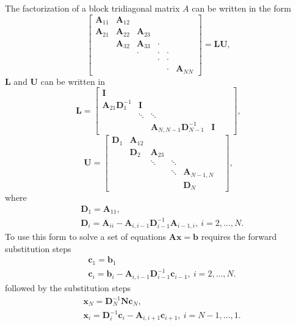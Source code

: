   \begin{alg}
    The factorization of a block tridiagonal matrix $A$ can be written
    in the form
    $$
    \left[
      \begin{array}{cccccc}
        \mathbf{A}_{11} & \mathbf{A}_{12}& & & & \\
        \mathbf{A}_{21} & \mathbf{A}_{22} & \mathbf{A}_{23} & & &\\
               & \mathbf{A}_{32} & \mathbf{A}_{33} & \cdot & &\\
               & & \cdot & \cdot & \cdot & \\
               & & & \cdot & \cdot & \\
        & & & & \cdot & \mathbf{A}_{NN}
      \end{array}
    \right]=\mathbf{LU},
    $$
    $\mathbf{L}$ and $\mathbf{U}$ can be written in 
    $$
 \mathbf{L}=\left[
      \begin{array}{cccccc}
       \mathbf{I} & & & & & \\
        \mathbf{A}_{21}\mathbf{D}_1^{-1} & \mathbf{I}& & & &\\
               & \ddots & \ddots & & \\
        & &\mathbf{A}_{N,N-1}\mathbf{D}_{N-1}^{-1} & \mathbf{I}
      \end{array}
    \right],
    $$
    $$
    \mathbf{U}=\left[
      \begin{array}{cccccc}
        \mathbf{D}_1 & \mathbf{A}_{12}& & & & \\
         & \mathbf{D}_2& \mathbf{A}_{23}& & &\\
               & & \ddots & \ddots & & \\
               & & & \ddots & \mathbf{A}_{N-1,N} & \\
        & & & & \mathbf{D}_N
      \end{array}
    \right],
    $$
    where
  \begin{align}
    &\mathbf{D}_1=\mathbf{A}_{11},\\
    &\mathbf{D}_i= \mathbf{A}_{ii}-\mathbf{A}_{i,i-1}\mathbf{D}_{i-1}^{-1}\mathbf{A}_{i-1,i},\ i=2,\ldots,N.
  \end{align}
  To use this form to solve a set of equations $\mathbf{Ax=b}$ requires the
  forward substitution steps
  \begin{align}
    &\mathbf{c}_1=\mathbf{b}_1\\
    &\mathbf{c}_i=\mathbf{b}_i-\mathbf{A}_{i,i-1}\mathbf{D}^{-1}_{i-1}\mathbf{c}_{i-1},\ i=2,\ldots,N.
  \end{align}
  followed by the substitution steps
  \begin{align}
   &\mathbf{x}_N=\mathbf{D}^{-1}_N\mathbf{Nc}_N,\\
   &\mathbf{x}_i=\mathbf{D}_i^{-1}\mathbf{c}_i-\mathbf{A}_{i,i+1}\mathbf{c}_{i+1},\ i=N-1,\ldots,1.
  \end{align}
\end{alg} 

